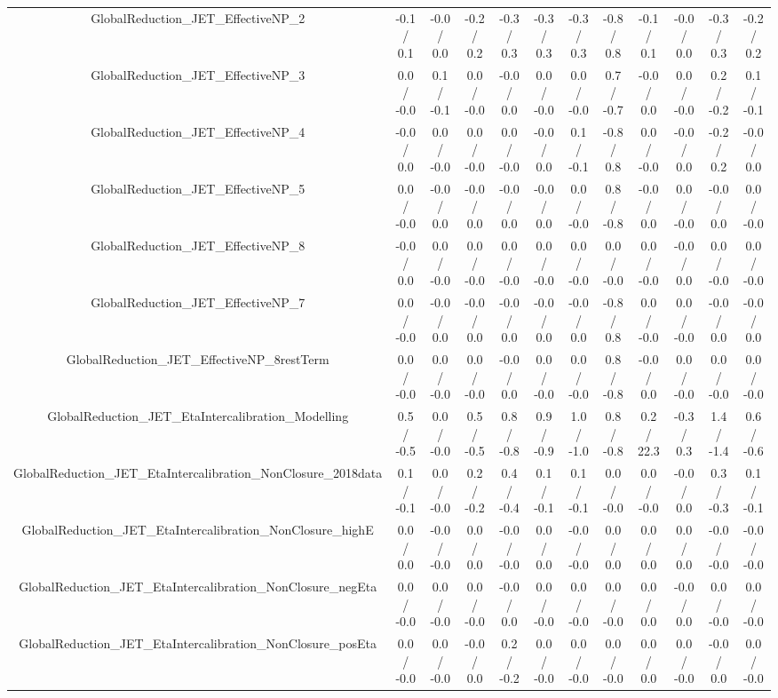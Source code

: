 \begin{table}[htbp]
\begin{center}
\begin{tabular}{|c|c|c|c|c|c|c|c|c|c|c|c|}
  GlobalReduction_JET_EffectiveNP_2 & -0.1 / 0.1 & -0.0 / 0.0 & -0.2 / 0.2 & -0.3 / 0.3 & -0.3 / 0.3 & -0.3 / 0.3 & -0.8 / 0.8 & -0.1 / 0.1 & -0.0 / 0.0 & -0.3 / 0.3 & -0.2 / 0.2 \\ 
  GlobalReduction_JET_EffectiveNP_3 & 0.0 / -0.0 & 0.1 / -0.1 & 0.0 / -0.0 & -0.0 / 0.0 & 0.0 / -0.0 & 0.0 / -0.0 & 0.7 / -0.7 & -0.0 / 0.0 & 0.0 / -0.0 & 0.2 / -0.2 & 0.1 / -0.1 \\ 
  GlobalReduction_JET_EffectiveNP_4 & -0.0 / 0.0 & 0.0 / -0.0 & 0.0 / -0.0 & 0.0 / -0.0 & -0.0 / 0.0 & 0.1 / -0.1 & -0.8 / 0.8 & 0.0 / -0.0 & -0.0 / 0.0 & -0.2 / 0.2 & -0.0 / 0.0 \\ 
  GlobalReduction_JET_EffectiveNP_5 & 0.0 / -0.0 & -0.0 / 0.0 & -0.0 / 0.0 & -0.0 / 0.0 & -0.0 / 0.0 & 0.0 / -0.0 & 0.8 / -0.8 & -0.0 / 0.0 & 0.0 / -0.0 & -0.0 / 0.0 & 0.0 / -0.0 \\ 
  GlobalReduction_JET_EffectiveNP_8 & -0.0 / 0.0 & 0.0 / -0.0 & 0.0 / -0.0 & 0.0 / -0.0 & 0.0 / -0.0 & 0.0 / -0.0 & 0.0 / -0.0 & 0.0 / -0.0 & -0.0 / 0.0 & 0.0 / -0.0 & 0.0 / -0.0 \\ 
  GlobalReduction_JET_EffectiveNP_7 & 0.0 / -0.0 & -0.0 / 0.0 & -0.0 / 0.0 & -0.0 / 0.0 & -0.0 / 0.0 & -0.0 / 0.0 & -0.8 / 0.8 & 0.0 / -0.0 & 0.0 / -0.0 & -0.0 / 0.0 & -0.0 / 0.0 \\ 
  GlobalReduction_JET_EffectiveNP_8restTerm & 0.0 / -0.0 & 0.0 / -0.0 & 0.0 / -0.0 & -0.0 / 0.0 & 0.0 / -0.0 & 0.0 / -0.0 & 0.8 / -0.8 & -0.0 / 0.0 & 0.0 / -0.0 & 0.0 / -0.0 & 0.0 / -0.0 \\ 
  GlobalReduction_JET_EtaIntercalibration_Modelling & 0.5 / -0.5 & 0.0 / -0.0 & 0.5 / -0.5 & 0.8 / -0.8 & 0.9 / -0.9 & 1.0 / -1.0 & 0.8 / -0.8 & 0.2 / 22.3 & -0.3 / 0.3 & 1.4 / -1.4 & 0.6 / -0.6 \\ 
  GlobalReduction_JET_EtaIntercalibration_NonClosure_2018data & 0.1 / -0.1 & 0.0 / -0.0 & 0.2 / -0.2 & 0.4 / -0.4 & 0.1 / -0.1 & 0.1 / -0.1 & 0.0 / -0.0 & 0.0 / -0.0 & -0.0 / 0.0 & 0.3 / -0.3 & 0.1 / -0.1 \\ 
  GlobalReduction_JET_EtaIntercalibration_NonClosure_highE & 0.0 / 0.0 & -0.0 / -0.0 & 0.0 / 0.0 & -0.0 / -0.0 & 0.0 / 0.0 & -0.0 / -0.0 & 0.0 / 0.0 & 0.0 / 0.0 & 0.0 / 0.0 & -0.0 / -0.0 & -0.0 / -0.0 \\ 
  GlobalReduction_JET_EtaIntercalibration_NonClosure_negEta & 0.0 / -0.0 & 0.0 / -0.0 & 0.0 / -0.0 & -0.0 / 0.0 & 0.0 / -0.0 & 0.0 / -0.0 & 0.0 / -0.0 & 0.0 / 0.0 & -0.0 / 0.0 & 0.0 / -0.0 & 0.0 / -0.0 \\ 
  GlobalReduction_JET_EtaIntercalibration_NonClosure_posEta & 0.0 / -0.0 & 0.0 / -0.0 & -0.0 / 0.0 & 0.2 / -0.2 & 0.0 / -0.0 & 0.0 / -0.0 & 0.0 / -0.0 & 0.0 / 0.0 & 0.0 / -0.0 & -0.0 / 0.0 & 0.0 / -0.0 \\ 

\end{tabular}
\end{center}
\end{table}
